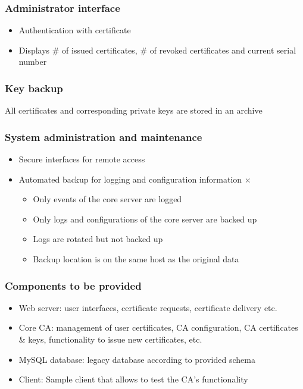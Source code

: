 \documentclass{article}
\begin{document}
\subsubsection{Administrator interface}
\begin{itemize}
\item Authentication with certificate \checkmark
\item Displays \# of issued certificates, \# of revoked certificates and current serial number \checkmark
\end{itemize}
\subsubsection{Key backup}
All certificates and corresponding private keys are stored in an archive \checkmark
\subsubsection{System administration and maintenance}
\begin{itemize}
\item Secure interfaces for remote access \checkmark
\item Automated backup for logging and configuration information $\times$
	\begin{itemize}
	\item Only events of the core server are logged
	\item Only logs and configurations of the core server are backed up
	\item Logs are rotated but not backed up
	\item Backup location is on the same host as the original data
	\end{itemize}
\end{itemize}
\subsubsection{Components to be provided}
\begin{itemize}
\item Web server: user interfaces, certificate requests, certificate delivery etc. \checkmark
\item Core CA: management of user certificates, CA configuration, CA certificates \& keys, functionality to issue new certificates, etc. \checkmark
\item MySQL database: legacy database according to provided schema \checkmark
\item Client: Sample client that allows to test the CA's functionality \checkmark
\end{itemize}
\end{document}
